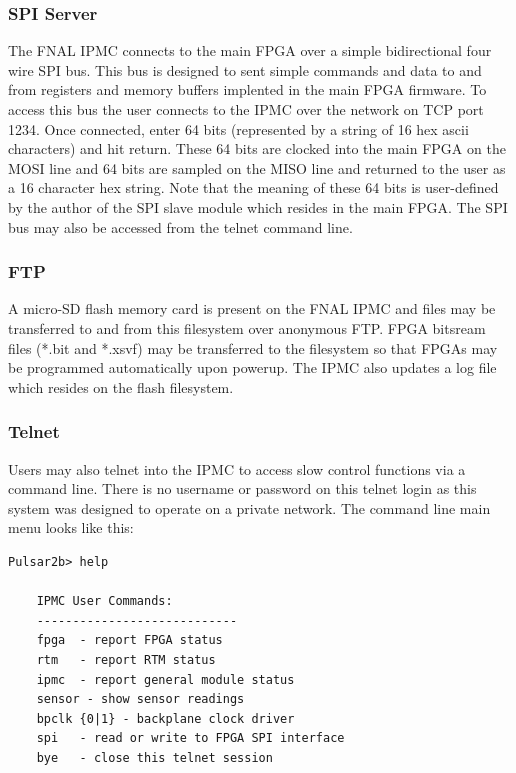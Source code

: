 \documentclass[letterpaper]{article}
\begin{document}
\subsubsection{SPI Server}

The FNAL IPMC connects to the main FPGA over a simple bidirectional four wire SPI bus.  This bus is designed to sent simple commands and data to and from registers and memory buffers implented in the main FPGA firmware.  To access this bus the user connects to the IPMC over the network on TCP port 1234.  Once connected, enter 64 bits (represented by a string of 16 hex ascii characters) and hit return.  These 64 bits are clocked into the main FPGA on the MOSI line and 64 bits are sampled on the MISO line and returned to the user as a 16 character hex string.  Note that the meaning of these 64 bits is user-defined by the author of the SPI slave module which resides in the main FPGA.  The SPI bus may also be accessed from the telnet command line.

\subsubsection{FTP}

A micro-SD flash memory card is present on the FNAL IPMC and files may be transferred to and from this filesystem over anonymous FTP.  FPGA bitsream files (*.bit and *.xsvf) may be transferred to the filesystem so that FPGAs may be programmed automatically upon powerup.  The IPMC also updates a log file which resides on the flash filesystem.

\subsubsection{Telnet}

Users may also telnet into the IPMC to access slow control functions via a command line.  There is no username or password on this telnet login as this system was designed to operate on a private network.  The command line main menu looks like this:

\begin{verbatim}
Pulsar2b> help

    IPMC User Commands:
    ----------------------------
    fpga  - report FPGA status
    rtm   - report RTM status
    ipmc  - report general module status
    sensor - show sensor readings
    bpclk {0|1} - backplane clock driver
    spi   - read or write to FPGA SPI interface
    bye   - close this telnet session
 \end{verbatim}
\end{document}
